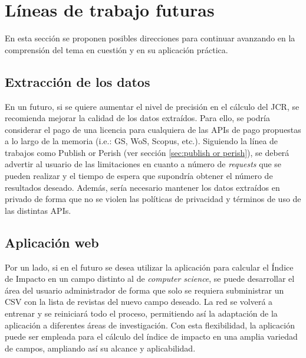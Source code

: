 


\section{Líneas de trabajo futuras}
En esta sección se proponen posibles direcciones para continuar avanzando en la comprensión del tema en cuestión y en su aplicación práctica.

\subsection{Extracción de los datos}
En un futuro, si se quiere aumentar el nivel de precisión en el cálculo del JCR, se recomienda mejorar la calidad de los datos extraídos. Para ello, se podría considerar el pago de una licencia para cualquiera de las APIs de pago propuestas a lo largo de la memoria (i.e.:  GS, WoS, Scopus, etc.). Siguiendo la línea de trabajos como Publish or Perish (ver sección \ref{sec:publish or perish}), se deberá advertir al usuario de las limitaciones en cuanto a número de \textit{requests} que se pueden realizar y el tiempo de espera que supondría obtener el número de resultados deseado. Además, sería necesario mantener los datos extraídos en privado de forma que no se violen las políticas de privacidad y términos de uso de las distintas APIs. 

\subsection{Aplicación web}

Por un lado, si en el futuro se desea utilizar la aplicación para calcular el Índice de Impacto en un campo distinto al de \textit{computer science}, se puede desarrollar el área del usuario administrador de forma que solo se requiera subministrar un CSV con la lista de revistas del nuevo campo deseado. La red se volverá a entrenar y se reiniciará todo el proceso, permitiendo así la adaptación de la aplicación a diferentes áreas de investigación. Con esta flexibilidad, la aplicación puede ser empleada para el cálculo del índice de impacto en una amplia variedad de campos, ampliando así su alcance y aplicabilidad.

